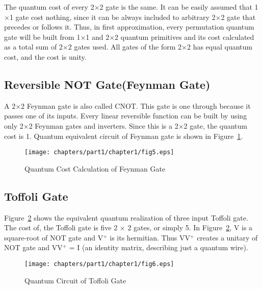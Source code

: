 \begin{property}\textnormal{
The quantum cost of every 2$\times$2 gate is the same. It can be easily assumed that 1$\times$1 gate cost nothing, since it can be always included to arbitrary 2$\times$2 gate that precedes or follows it. Thus, in first approximation, every permutation quantum gate will be built from 1$\times$1 and 2$\times$2 quantum primitives and its cost calculated as a total sum of 2$\times$2 gates used. All gates of the form 2$\times$2 has equal quantum cost, and the cost is unity.}
\end{property}

\subsection{Reversible NOT Gate(Feynman Gate)}

\begin{example}\textnormal{
A 2$\times$2 Feynman gate is also called CNOT. This gate is one through because it passes one of its inputs. Every linear reversible function can be built by using only 2$\times$2 Feynman gates and inverters. Since this is a 2$\times$2 gate, the quantum cost is 1. Quantum equivalent circuit of Feynman gate is shown in Figure~\ref{fig:p1_c1_fig5}.}
\end{example}

\begin{figure}[h]
\centering
\texttt{[image: chapters/part1/chapter1/fig5.eps]}
\caption{Quantum Cost Calculation of Feynman Gate}
\label{fig:p1_c1_fig5}
\end{figure}

\subsection{Toffoli Gate}
Figure~\ref{fig:p1_c1_fig6} shows the equivalent quantum realization of three input Toffoli gate. The cost of, the Toffoli gate is five 2 $\times$ 2 gates, or simply 5. In Figure~\ref{fig:p1_c1_fig6}, V is a square-root of NOT gate and V$^+$ is its hermitian. Thus VV$^+$ creates a unitary  of NOT gate and VV$^+$ = I (an identity matrix, describing just a quantum wire).

\begin{figure}[h]
\centering
\texttt{[image: chapters/part1/chapter1/fig6.eps]}
\caption{Quantum Circuit of Toffoli Gate}
\label{fig:p1_c1_fig6}
\end{figure}

